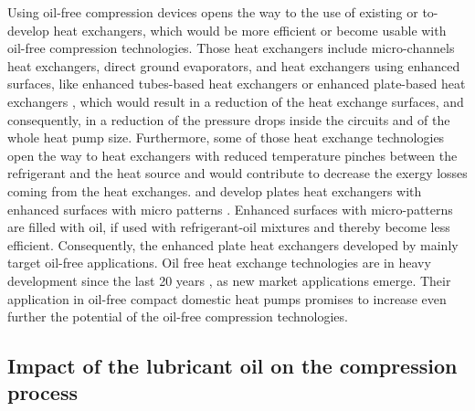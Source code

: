 Using oil-free compression devices opens the way to the use of
existing or to-develop heat exchangers, which would be more efficient
or become usable with oil-free compression technologies. Those heat
exchangers include micro-channels heat exchangers, direct ground
evaporators, and heat exchangers using enhanced surfaces, like
enhanced tubes-based heat exchangers
\citep{Ribatski-Jacobi-2005a,Habert-2009a,vanrooyen-2011a} or enhanced
plate-based heat exchangers \citep{Furberg-2006a}, which would result
in a reduction of the heat exchange surfaces, and consequently, in a
reduction of the pressure drops inside the circuits and of the whole
heat pump size. Furthermore, some of those heat exchange technologies
open the way to heat exchangers with reduced temperature pinches
between the refrigerant and the heat source and would contribute to
decrease the exergy losses coming from the heat
exchanges. \citet{Furberg-2006a} and \citet{Li-2008a} develop plates
heat exchangers with enhanced surfaces with micro patterns
\citep{Furberg-Muhammed-2009a}. Enhanced surfaces with micro-patterns
are filled with oil, if used with refrigerant-oil mixtures
\citep[Fig.\,10\,\&\,11 p.\,985--986]{Spindler-Hahne-2009a} and
thereby become less efficient. Consequently, the enhanced plate heat
exchangers developed by \citet{Furberg-Muhammed-2009a} mainly target
oil-free applications. Oil free heat exchange technologies are in
heavy development since the last 20 years \citep[Fig.\,1
p.\,186]{BandarraFilho-Thome-2009a}, as new market applications
emerge. Their application in oil-free compact domestic heat pumps
promises to increase even further the potential of the oil-free
compression technologies.

\subsection{Impact of the lubricant oil on the
  compression process}
\label{sec:oil-cp}

